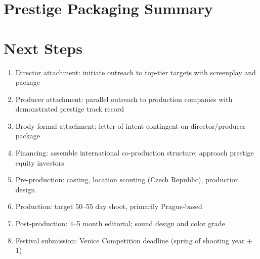 \section{Prestige Packaging Summary}


\section{Next Steps}

\begin{enumerate}[leftmargin=*]
\item Director attachment: initiate outreach to top-tier targets with screenplay and package
\item Producer attachment: parallel outreach to production companies with demonstrated prestige track record
\item Brody formal attachment: letter of intent contingent on director/producer package
\item Financing: assemble international co-production structure; approach prestige equity investors
\item Pre-production: casting, location scouting (Czech Republic), production design
\item Production: target 50--55 day shoot, primarily Prague-based
\item Post-production: 4--5 month editorial; sound design and color grade
\item Festival submission: Venice Competition deadline (spring of shooting year + 1)
\end{enumerate}
